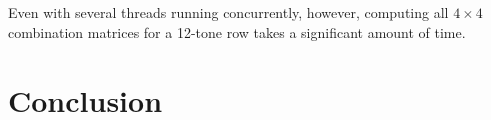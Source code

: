 Even with several threads running concurrently, however, computing all $4 \times 4$ combination matrices for a 12-tone row takes a significant amount of time.




\section{Conclusion}

